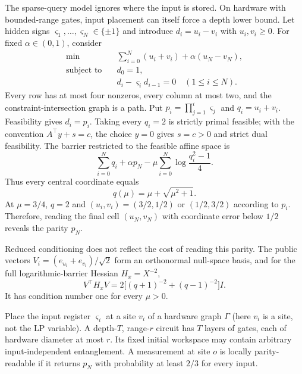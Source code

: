 The sparse-query model ignores where the input is stored.  On hardware with
bounded-range gates, input placement can itself force a depth lower bound.  Let hidden signs
$\varsigma_1,\ldots,\varsigma_N\in\{\pm1\}$ and introduce
$d_i=u_i-v_i$ with $u_i,v_i\geq0$.  For fixed $\alpha\in(0,1)$, consider
\begin{equation}
 \begin{aligned}
  \min\quad&\sum_{i=0}^N(u_i+v_i)+\alpha(u_N-v_N),\\
  \text{subject to}\quad&d_0=1,\\
  &d_i-\varsigma_i d_{i-1}=0\quad(1\leq i\leq N).
 \end{aligned}                                             \label{eq:structural-locality-lp}
\end{equation}
Every row has at most four nonzeros, every column at most two, and the
constraint-intersection graph is a path.  Put
$p_i=\prod_{j=1}^i\varsigma_j$ and $q_i=u_i+v_i$.  Feasibility gives
$d_i=p_i$.  Taking every $q_i=2$ is strictly primal feasible; with the
convention $A^\top y+s=c$, the choice $y=0$ gives $s=c>0$ and strict dual
feasibility.  The barrier restricted to the feasible affine space is
\begin{equation}
 \sum_{i=0}^Nq_i+\alpha p_N
 -\mu\sum_{i=0}^N\log\frac{q_i^2-1}{4}.                  \label{eq:structural-locality-barrier}
\end{equation}
Thus every central coordinate equals
\begin{equation}
 q(\mu)=\mu+\sqrt{\mu^2+1}.                              \label{eq:structural-locality-center}
\end{equation}
At $\mu=3/4$, $q=2$ and
$(u_i,v_i)=(3/2,1/2)$ or $(1/2,3/2)$ according to $p_i$.  Therefore,
reading the final cell $(u_N,v_N)$ with coordinate error below $1/2$ reveals
the parity $p_N$.

Reduced conditioning does not reflect the cost of reading this parity.  The
public
vectors $V_i=(e_{u_i}+e_{v_i})/\sqrt2$ form an orthonormal null-space basis,
and for the full logarithmic-barrier Hessian $H_x=X^{-2}$,
\begin{equation}
 V^\top H_xV
 =2\bigl[(q+1)^{-2}+(q-1)^{-2}\bigr]I.                   \label{eq:structural-locality-condition-one}
\end{equation}
It has condition number one for every $\mu>0$.

Place the input register $\varsigma_i$ at a site $v_i$ of a hardware graph
$\Gamma$ (here $v_i$ is a site, not the LP variable).  A depth-$T$,
range-$r$ circuit has $T$ layers of gates, each of hardware diameter at most
$r$.  Its fixed initial workspace may contain arbitrary input-independent
entanglement.  A measurement at site $o$
is locally parity-readable if it returns $p_N$ with probability at least
$2/3$ for every input.


